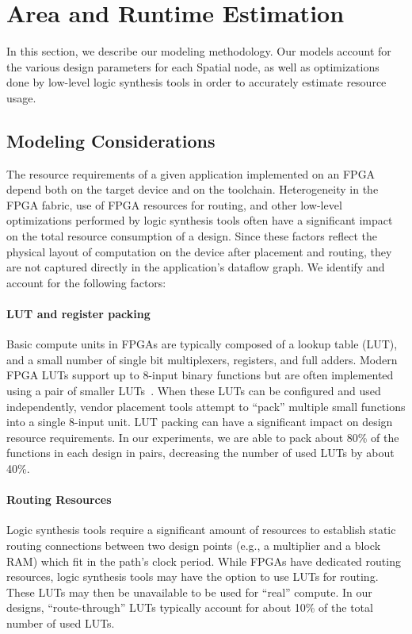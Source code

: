 \section{Area and Runtime Estimation}
\label{sec:modeling}
In this section, we describe our modeling methodology. Our models account for the various
design parameters for each Spatial node, as well as optimizations done by low-level logic
synthesis tools in order to accurately estimate resource usage.

\subsection{Modeling Considerations}
\label{ss:modeling-con}
The resource requirements of a given application implemented on an FPGA depend both on the target device and on the toolchain.
Heterogeneity in the FPGA fabric, use of FPGA resources for routing, and other low-level optimizations performed by logic
synthesis tools often have a significant impact on the total resource consumption of a design. Since these factors reflect
the physical layout of computation on the device after placement and routing, they are not captured directly in the application's dataflow graph.
We identify and account for the following factors:

\paragraph{LUT and register packing} Basic compute units in FPGAs are typically composed of a lookup table (LUT), and a small number of single bit multiplexers, registers, and full adders.
  Modern FPGA LUTs support up to 8-input binary functions but are often implemented using a pair of smaller LUTs~\cite{stratixv,virtex7}.
  When these LUTs can be configured and used independently, vendor placement tools attempt to ``pack'' multiple small functions into a single 8-input unit.
  LUT packing can have a significant impact on design resource requirements.
  In our experiments, we are able to pack about 80\% of the functions in each design in pairs, decreasing the number of used LUTs by about 40\%.

\paragraph{Routing Resources} Logic synthesis tools require a significant amount of resources to establish static routing connections
between two design points (e.g., a multiplier and a block RAM) which fit in the path's clock period. While FPGAs have dedicated routing resources,
logic synthesis tools may have the option to use LUTs for routing. These LUTs may then be unavailable to be used for ``real'' compute.
In our designs, ``route-through'' LUTs typically account for about 10\% of the total number of used LUTs.


